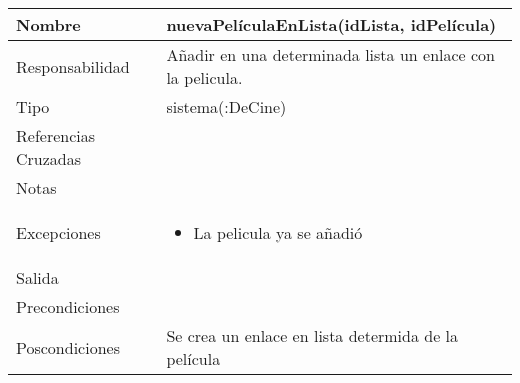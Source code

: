 \documentclass{article}
\begin{document}
\begin{table}[h]
\begin{tabular}{|l|l|l|l|l|l|}
\hline
\multicolumn{2}{|p{3cm}|}{Nombre} & \multicolumn{4}{p{10cm}|}{\textbf{nuevaPelículaEnLista(idLista, idPelícula)}}\\
\hline
\multicolumn{2}{|p{3cm}|}{Responsabilidad} & \multicolumn{4}{p{10cm}|}{Añadir en una determinada lista un enlace con la pelicula.} \\
\hline
\multicolumn{2}{|p{3cm}|}{Tipo} & \multicolumn{4}{p{10cm}|}{sistema(:DeCine)} \\
\hline
\multicolumn{2}{|p{3cm}|}{Referencias Cruzadas} & \multicolumn{4}{p{10cm}|}{} \\
\hline
\multicolumn{2}{|p{3cm}|}{Notas} & \multicolumn{4}{p{10cm}|}{} \\
\hline
\multicolumn{2}{|p{3cm}|}{Excepciones} & \multicolumn{4}{p{10cm}|}{\begin{itemize}
\item La pelicula ya se añadió
\end{itemize}} \\
\hline
\multicolumn{2}{|p{3cm}|}{Salida} & \multicolumn{4}{p{10cm}|}{} \\
\hline
\multicolumn{2}{|p{3cm}|}{Precondiciones} & \multicolumn{4}{p{10cm}|}{} \\
\hline
\multicolumn{2}{|p{3cm}|}{Poscondiciones} & \multicolumn{4}{p{10cm}|}{Se crea un enlace en lista determida de la película} \\
\hline
\end{tabular}
\end{table}
\end{document}
